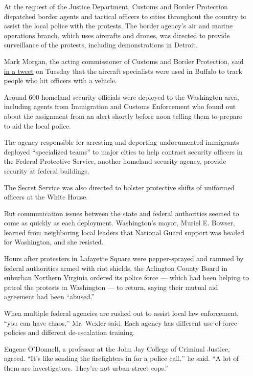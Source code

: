 At the request of the Justice Department, Customs and Border Protection
dispatched border agents and tactical officers to cities throughout the
country to assist the local police with the protests. The border
agency's air and marine operations branch, which uses aircrafts and
drones, was directed to provide surveillance of the protests, including
demonstrations in Detroit.

Mark Morgan, the acting commissioner of Customs and Border Protection,
said
\href{https://twitter.com/CBPMarkMorgan/status/1267845664156901380?s=20}{in
a tweet} on Tuesday that the aircraft specialists were used in Buffalo
to track people who hit officers with a vehicle.

Around 600 homeland security officials were deployed to the Washington
area, including agents from Immigration and Customs Enforcement who
found out about the assignment from an alert shortly before noon telling
them to prepare to aid the local police.

The agency responsible for arresting and deporting undocumented
immigrants deployed ``specialized teams'' to major cities to help
contract security officers in the Federal Protective Service, another
homeland security agency, provide security at federal buildings.

The Secret Service was also directed to bolster protective shifts of
uniformed officers at the White House.

But communication issues between the state and federal authorities
seemed to come as quickly as each deployment. Washington's mayor, Muriel
E. Bowser, learned from neighboring local leaders that National Guard
support was headed for Washington, and she resisted.

Hours after protesters in Lafayette Square were pepper-sprayed and
rammed by federal authorities armed with riot shields, the Arlington
County Board in suburban Northern Virginia ordered its police force ---
which had been helping to patrol the protests in Washington --- to
return, saying their mutual aid agreement had been ``abused.''

When multiple federal agencies are rushed out to assist local law
enforcement, ``you can have chaos,'' Mr. Wexler said. Each agency has
different use-of-force policies and different de-escalation training.

Eugene O'Donnell, a professor at the John Jay College of Criminal
Justice, agreed. ``It's like sending the firefighters in for a police
call,'' he said. ``A lot of them are investigators. They're not urban
street cops.''

